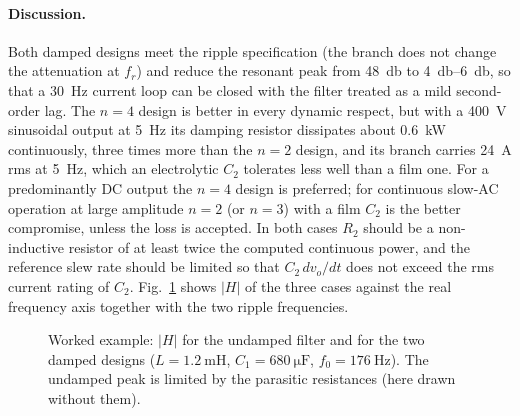 \documentclass[11pt,a4paper]{article}
\begin{document}
\paragraph{Discussion.} Both damped designs meet the ripple specification (the branch
does not change the attenuation at $f_r$) and reduce the resonant peak from
\SI{48}{\decibel} to \SIrange{4}{6}{\decibel}, so that a \SI{30}{\hertz} current loop can
be closed with the filter treated as a mild second-order lag. The $n = 4$ design is
better in every dynamic respect, but with a \SI{400}{\volt} sinusoidal output at
\SI{5}{\hertz} its damping resistor dissipates about \SI{0.6}{\kilo\watt} continuously,
three times more than the $n = 2$ design, and its branch carries \SI{24}{\ampere} rms
at \SI{5}{\hertz}, which an electrolytic $C_2$ tolerates less well than a film one.
For a predominantly DC output the $n = 4$ design is preferred; for continuous slow-AC
operation at large amplitude $n = 2$ (or $n = 3$) with a film $C_2$ is the better
compromise, unless the loss is accepted. In both cases $R_2$ should be a non-inductive
resistor of at least twice the computed continuous power, and the reference slew rate
should be limited so that $C_2\,dv_o/dt$ does not exceed the rms current rating of $C_2$.
Fig.~\ref{fig:example} shows $|H|$ of the three cases against the real frequency axis
together with the two ripple frequencies.

\begin{figure}[htb]
\centering
{}
\caption{Worked example: $|H|$ for the undamped filter and for the two damped designs
($L = \SI{1.2}{\milli\henry}$, $C_1 = \SI{680}{\micro\farad}$, $f_0 = \SI{176}{\hertz}$).
The undamped peak is limited by the parasitic resistances (here drawn without them).}
\label{fig:example}
\end{figure}
\end{document}
